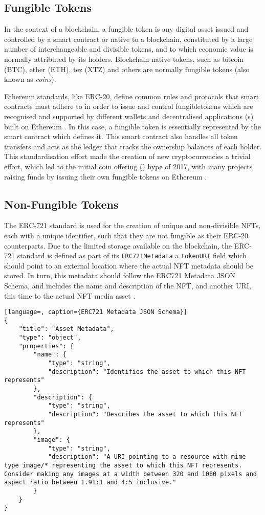 \subsection{Fungible Tokens}

In the context of a blockchain, a fungible token is any digital asset issued and controlled by a smart contract or native to a blockchain, constituted by a large number of interchangeable and divisible tokens, and to which economic value is normally attributed by its holders. Blockchain native tokens, such as bitcoin (BTC), ether (ETH), tez (XTZ) and others are normally fungible tokens (also known as \emph{coins}). 

Ethereum standards, like ERC-20, define common rules and protocols that smart contracts must adhere to in order to issue and control \gls{fungibletoken}s  which are recognised and supported by different wallets and \gls{decentralised application}s (s) built on Ethereum \cite{ERC20TokenStandarda}. In this case, a fungible token is essentially represented by the smart contract which defines it. This smart contract also handles all token transfers and acts as the ledger that tracks the ownership balances of each holder. 
This standardisation effort made the creation of new cryptocurrencies a trivial effort, which led to the \gls{initial coin offering} () hype of 2017, with many projects raising funds by issuing their own fungible tokens on Ethereum \cite{cuffeRoleErc20Token2018}.


\subsection{Non-Fungible Tokens}

The ERC-721 standard is used for the creation of unique and non-divisible NFTs, each with a unique identifier, such that they are not fungible as their ERC-20 counterparts.
Due to the limited storage available on the blockchain, the ERC-721 standard is defined as part of its \texttt{ERC721Metadata} a \texttt{tokenURI} field which should point to an external location where the actual NFT metadata should be stored. In turn, this metadata should follow the ERC721 Metadata JSON Schema, and includes the name and description of the NFT, and another URI, this time to the actual NFT media asset \cite{ERC721NonFungibleToken}.

\begin{lstlisting}[language=, caption={ERC721 Metadata JSON Schema}]
{
    "title": "Asset Metadata",
    "type": "object",
    "properties": {
        "name": {
            "type": "string",
            "description": "Identifies the asset to which this NFT represents"
        },
        "description": {
            "type": "string",
            "description": "Describes the asset to which this NFT represents"
        },
        "image": {
            "type": "string",
            "description": "A URI pointing to a resource with mime type image/* representing the asset to which this NFT represents. Consider making any images at a width between 320 and 1080 pixels and aspect ratio between 1.91:1 and 4:5 inclusive."
        }
    }
}
\end{lstlisting}

